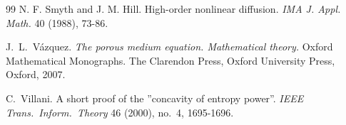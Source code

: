 \documentclass[12pt]{amsart}
\theoremstyle{plain}
\theoremstyle{definition}
\theoremstyle{remark}
\begin{document}
\begin{thebibliography}{99}
 N. F. Smyth and J. M. Hill. High-order nonlinear diffusion. {\em IMA J. Appl. Math.} 40 (1988), 73-86.

 J.~L.~V\'azquez. {\em The porous medium equation. Mathematical theory.} Oxford Mathematical Monographs. The Clarendon Press, Oxford University Press, Oxford, 2007.

 C.~Villani. A short proof of the ”concavity of entropy power”. {\em IEEE Trans.~Inform.~Theory} 46 (2000), no.~4, 1695-1696.

\end{thebibliography}
\end{document}
